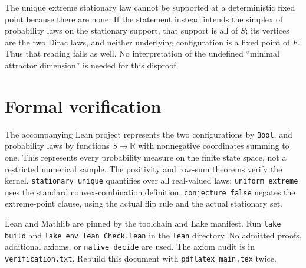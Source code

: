 \documentclass[10pt]{article}
\begin{document}
The unique extreme stationary law cannot be supported at a deterministic
fixed point because there are none. If the statement instead intends the
simplex of probability laws on the stationary support, that support is all
of $S$; its vertices are the two Dirac laws, and neither underlying
configuration is a fixed point of $F$. Thus that reading fails as well.
No interpretation of the undefined ``minimal attractor dimension'' is
needed for this disproof.

\section{Formal verification}
The accompanying Lean project represents the two configurations by
\texttt{Bool}, and probability laws by functions $S\to\mathbb R$ with
nonnegative coordinates summing to one. This represents every probability
measure on the finite state space, not a restricted numerical sample.
The positivity and row-sum theorems verify the
kernel. \texttt{stationary\_unique} quantifies over all real-valued laws;
\texttt{uniform\_extreme} uses the standard convex-combination definition.
\texttt{conjecture\_false} negates the extreme-point clause, using the actual
flip rule and the actual stationary set.

Lean and Mathlib are pinned by the toolchain and Lake manifest.
Run \texttt{lake build} and \texttt{lake env lean Check.lean} in the
\texttt{lean} directory. No admitted proofs, additional axioms, or
\texttt{native\_decide} are used. The axiom audit is in
\texttt{verification.txt}. Rebuild this document with
\texttt{pdflatex main.tex} twice.
\end{document}
